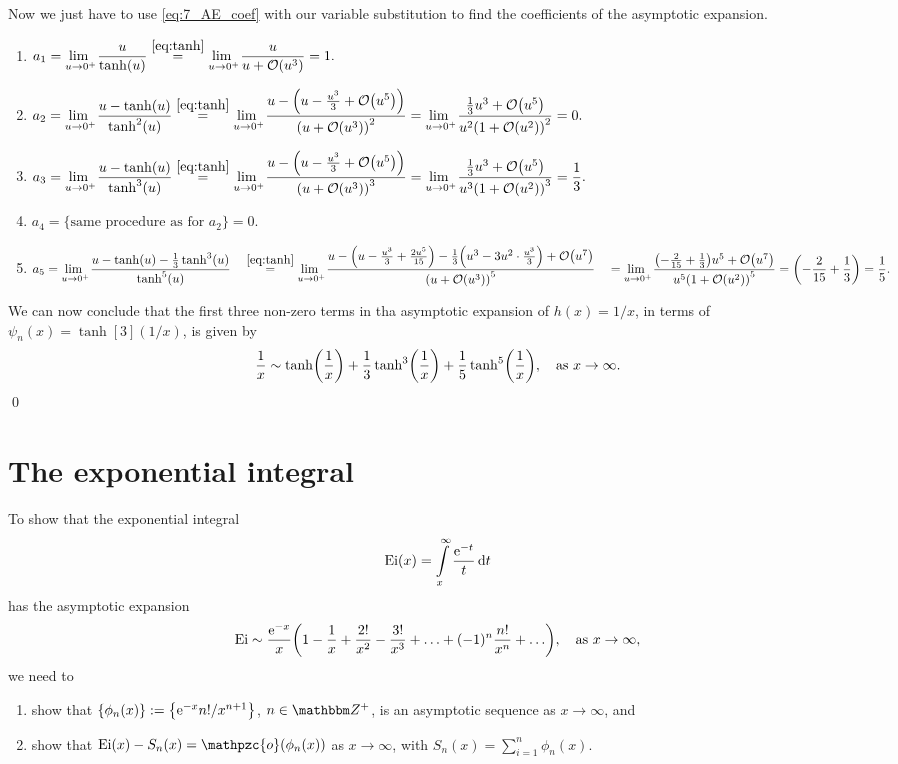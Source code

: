 \documentclass[11pt,letter, swedish, english
]{article}
\newcommand{\oh}{\ensuremath\mathpzc{o}}
\newcommand{\Ei}{\ensuremath\mathrm{Ei}}
\begin{document}
Now we just have to use \eqref{eq:7_AE_coef} with our variable
substitution to find the coefficients of the asymptotic expansion.
\begin{enumerate}
\item $\displaystyle a_1=\limu\frac{u}{\tanh(u)}
\stackrel{\eqref{eq:tanh}}{=}\limu \frac{u}{u+\order{u^3}} = 1.
$
\item $\displaystyle a_2=\limu\frac{u-\tanh(u)}{\tanh^2(u)}
\stackrel{\eqref{eq:tanh}}{=}\limu 
\frac{u-\qty(u-\frac{u^3}{3} + \order{u^5})}{\qty(u+\order{u^3})^2} 
=\limu 
\frac{\frac{1}{3}u^3 + \order{u^5}}{u^2\qty(1+\order{u^2})^2}= 0.
$
\item $\displaystyle a_3=\limu\frac{u-\tanh(u)}{\tanh^3(u)}
\stackrel{\eqref{eq:tanh}}{=}\limu 
\frac{u-\qty(u-\frac{u^3}{3} + \order{u^5})}{\qty(u+\order{u^3})^3} 
=\limu 
\frac{\frac{1}{3}u^3 + \order{u^5}}{u^3\qty(1+\order{u^2})^3}= \frac{1}{3}.
$
\item $\displaystyle a_4=
\Big\{\text{same procedure as for }a_2\Big\}= 0.
$
\item $\displaystyle a_5=\limu\frac{u-\tanh(u)-\frac{1}{3}\tanh^3(u)}{\tanh^5(u)}
\\\phantom{a_5}\stackrel{\eqref{eq:tanh}}{=}\limu 
\frac{u-\qty(u - \frac{u^3}{3} + \frac{2u^5}{15})
        -\frac{1}{3}\qty(u^3 - 3u^2\cdot\frac{u^3}{3}) +\order{u^7}}
     {\qty(u+\order{u^3})^5} 
\\\phantom{a_5}
=\limu 
\frac{\qty(-\frac{2}{15}+\frac{1}{3})u^5 + \order{u^7}}
     {u^5\qty(1+\order{u^2})^5}
= \qty(-\frac{2}{15}+\frac{1}{3}) = \frac{1}{5}.
$
\end{enumerate}
We can now conclude that the first three non-zero terms in tha
asymptotic expansion of $h(x)=1/x$, in terms of
$\psi_n(x)=\tanh[3](1/x)$, is given by
\begin{equation}
\frac{1}{x} \sim \tanh(\frac{1}{x}) 
+ \frac{1}{3}\tanh[3](\frac{1}{x})
+ \frac{1}{5}\tanh[5](\frac{1}{x}) \as x\to\infty.
\end{equation}
\qed





\section{The exponential integral}
To show that the exponential integral
\begin{equation}
\Ei(x)=\int_x^\infty \frac{\ee^{-t}}{t}\id{t}
\end{equation}
has the asymptotic expansion
\begin{equation}\label{eq:8_Ei_AE}
\Ei \sim \frac{\ee^{-x}}{x}
\qty(1-\frac{1}{x}+\frac{2!}{x^2}-\frac{3!}{x^3}+\ldots+(-1)^n\frac{n!}{x^n}+\ldots)
\as x\to\infty,
\end{equation}
we need to
\begin{enumerate}[label=(\roman*)]
\item show that $\{\phi_n(x)\}:=\qty{\mathrm{e}^{-x}n!/x^{n+1}}$, $n\in\Z^+$, is an
asymptotic sequence as $x\to\infty$, and
\item show that $\Ei(x)-S_n(x)=\oh(\phi_n(x))$ as $x\to\infty$, with
$S_n(x)=\sum_{i=1}^n\phi_n(x)$. 
\end{enumerate}
\end{document}
